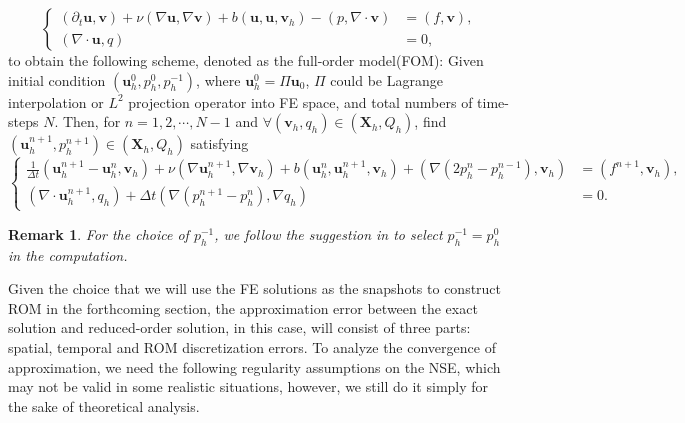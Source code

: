 \documentclass[10pt,twoside,openany,UTF8,CJK]{article}
\newtheorem{Remark}{Remark}[section]
\begin{document}
	\begin{equation}\label{ContVariNSEs}
		\left\{
		\begin{aligned}
			\left(\partial_t\boldsymbol{u}, \boldsymbol{v}\right) + \nu\left(\nabla \boldsymbol{u}, \nabla \boldsymbol{v}\right) + b\left(\boldsymbol{u},\boldsymbol{u},\boldsymbol{v}_h\right) - \left(p, \nabla \cdot\boldsymbol{v}\right) &=\left(f, \boldsymbol{v}\right), \\
			\left(\nabla \cdot \boldsymbol{u}, q\right) &= 0,
		\end{aligned}
		\right.
	\end{equation}
	to obtain the following scheme, denoted as the full-order model(FOM): Given initial condition $(\boldsymbol{u}_h^0,p^0_h,p^{-1}_h)$, where $\boldsymbol{u}_h^0 = \Pi \boldsymbol{u}_0$, $\Pi$ could be Lagrange interpolation or $L^2$ projection operator into FE space, and total numbers of time-steps $N$. Then, for $n=1,2,\cdots, N\!-\!1$ and $\forall (\boldsymbol{v}_h,q_h) \in (\boldsymbol{X}_h, Q_h)$, find $(\boldsymbol{u}^{n+1}_h,p^{n+1}_h) \in (\boldsymbol{X}_h, Q_h)$ satisfying 
	\begin{equation}\label{FEM-FOM}
		\left\{
		\begin{aligned}
			\frac{1}{\Delta t}\left(\boldsymbol{u}_h^{n+1}-\boldsymbol{u}_h^n, \boldsymbol{v}_h\right) + \nu\left(\nabla \boldsymbol{u}_h^{n+1}, \nabla \boldsymbol{v}_h\right) + b\left(\boldsymbol{u}_h^n,\boldsymbol{u}_h^{n+1},\boldsymbol{v}_h\right) + \left(\nabla\left(2 p_h^n-p_h^{n-1}\right), \boldsymbol{v}_h\right) &=\left(f^{n+1}, \boldsymbol{v}_h\right), \\
			\left(\nabla \cdot \boldsymbol{u}_h^{n+1}, q_h\right) + \Delta t\left(\nabla\left(p_h^{n+1}-p_h^n\right), \nabla q_h\right) &= 0.
		\end{aligned}
		\right.
	\end{equation}
    \begin{Remark}
    	For the choice of $p^{-1}_h$, we follow the suggestion in \cite{Proj-Guermond-1998-IJNMF} to select $p^{-1}_h = p^0_h$ in the computation.
    \end{Remark}
    \indent Given the choice that we will use the FE solutions as the snapshots to construct ROM in the forthcoming section, the approximation error between the exact solution and reduced-order solution, in this case, will consist of three parts: spatial, temporal and ROM discretization errors. To analyze the convergence of approximation, we need the following regularity assumptions on the NSE, which may not be valid in some realistic situations, however, we still do it simply for the sake of theoretical analysis.
\end{document}
